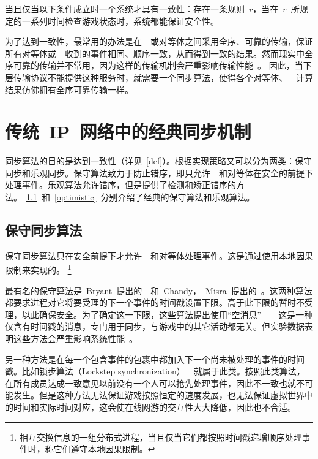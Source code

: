 \begin{zjudefine} [一致性]
当且仅当以下条件成立时一个系统才具有一致性：存在一条规则~$r$，当在~$r$~所规定的一系列时间检查游戏状态时，系统都能保证安全性。
\end{zjudefine}

为了达到一致性，最常用的办法是在~\gss~或对等体之间采用全序、可靠的传输，保证所有对等体或~\gss~收到的事件相同、顺序一致，从而得到一致的结果。然而现实中全序可靠的传输并不常用，因为这样的传输机制会严重影响传输性能~\cite{impact}。 因此，当下层传输协议不能提供这种服务时，就需要一个同步算法，使得各个对等体、~\gss~计算结果仿佛拥有全序可靠传输一样。


\section{传统~IP~网络中的经典同步机制}
\label{traditional}
同步算法的目的是达到一致性（详见~\ref{def}）。根据实现策略又可以分为两类：保守同步和乐观同步。保守算法致力于防止错序，即只允许~\gss~和对等体在安全的前提下处理事件。乐观算法允许错序，但是提供了检测和矫正错序的方法。~\ref{conservative}~和~\ref{optimistic}~分别介绍了经典的保守算法和乐观算法。


\subsection{保守同步算法}
\label{conservative}
保守同步算法只在安全前提下才允许~\gss~和对等体处理事件。这是通过使用本地因果限制来实现的。
\renewcommand\baselinestretch{1} %
\footnote{相互交换信息的一组分布式进程，当且仅当它们都按照时间戳递增顺序处理事件时，称它们遵守本地因果限制。}

最有名的保守算法是~Bryant~提出的~\cite{bryant}~和~Chandy，~Misra~提出的~\cite{chandy}。这两种算法都要求进程对它将要受理的下一个事件的时间戳设置下限。高于此下限的暂时不受理，以此确保安全。为了确定这一下限，这些算法提出使用“空消息”——这是一种仅含有时间戳的消息，专门用于同步，与游戏中的其它活动都无关。但实验数据表明这些方法会严重影响系统性能~\cite{Ferretti2005}。

另一种方法是在每一个包含事件的包裹中都加入下一个尚未被处理的事件的时间戳。比如锁步算法（Lockstep synchronization）~\cite{lockstep}~就属于此类。按照此类算法，在所有成员达成一致意见以前没有一个人可以抢先处理事件，因此不一致也就不可能发生。但是这种方法无法保证游戏按照恒定的速度发展，也无法保证虚拟世界中的时间和实际时间对应，这会使在线网游的交互性大大降低，因此也不合适。

